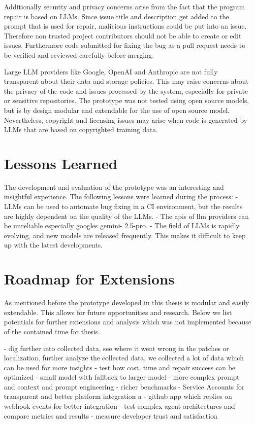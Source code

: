 Additionally security and privacy concerns arise from the fact that the program repair is based on LLMs. Since issue title and description get added to the prompt that is used for repair, malicious instructions could be put into an issue. Therefore non trusted project contributors should not be able to create or edit issues. Furthermore code submitted for fixing the bug as a pull request needs to be verified and reviewed carefully before merging.

Large LLM providers like Google, OpenAI and Anthropic are not fully transparent about their data and storage policies. This may raise concerns about the privacy of the code and issues processed by the system, especially for private or sensitive repositories. The prototype was not tested using open source models, but is by design modular and  extendable for the use of open source model. Nevertheless, copyright and licensing issues may arise when code is generated by LLMs that are based on copyrighted training data. \cite{sauvolaFutureSoftwareDevelopment2024, houLargeLanguageModels2024}


\section{Lessons Learned}
The development and evaluation of the prototype was an interesting and insightful experience. The following lessons were learned during the process:
- LLMs can be used to automate bug fixing in a CI environment, but the results are highly dependent on the quality of the LLMs.
- The apis of llm providers can be unreliable especially googles gemini- 2.5-pro.
- The field of LLMs is rapidly evolving, and new models are released frequently. This makes it difficult to keep up with the latest developments.


\section{Roadmap for Extensions} \label{section:roadmap}
As mentioned before the prototype developed in this thesis is modular and easily extendable. This allows for future opportunities and research. Below we list potentials for further extensions and analysis which was not implemented because of the contained time for thesis.

- dig further into collected data, see where it went wrong in the patches or localization, further analyze the collected data, we collected a lot of data which can be used for more insights
- test how cost, time and repair success can be optimized
- small model with fallback to larger model
- more complex prompt and context and prompt engineering
- richer benchmarks
- Service Accounts for transparent and better platform integration a
- github app which replies on webhook events for better integration
- test complex agent architectures and compare metrics and results
- measure developer trust and satisfaction
